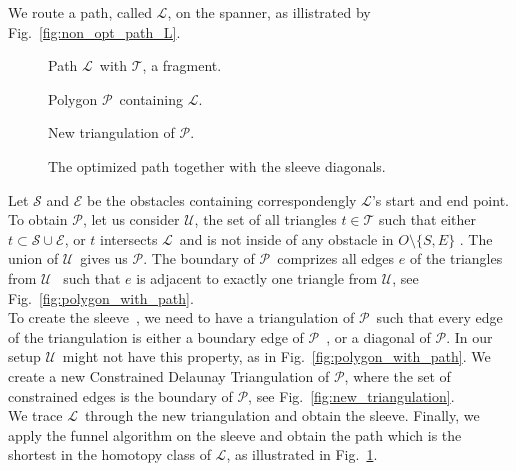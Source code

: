 \documentclass{gd-llncs}
\newcommand{\cdt}{$\mathcal{T}$}
\newcommand{\unpath}{$\mathcal{L}$}
\newcommand{\triset}{$\mathcal{U}$}
\newcommand{\plg}{$\mathcal{P}$}
\begin{document}
{We route a path, called \unpath, on the spanner, as illistrated by Fig.~\ref{fig:non_opt_path_L}.
\begin{figure}[!tbp]
  \centering
  \begin{minipage}[b]{0.45\textwidth}
    
    \caption{Path \unpath~with \cdt, a fragment.}
    \label{fig:non_opt_path_L}
  \end{minipage}
  \hfill
  \begin{minipage}[b]{0.45\textwidth}
    
    \caption{Polygon \plg~containing \unpath.}
    \label{fig:polygon_with_path}
  \end{minipage}
  \vfill
  \begin{minipage}[b]{0.45\textwidth}
    
    \caption{New triangulation of \plg.}
    \label{fig:new_triangulation}
  \end{minipage}
  \hfill
  \begin{minipage}[b]{0.45\textwidth}
    
    \caption{The optimized path together with the sleeve diagonals.}
    \label{fig:optimized_path}
  \end{minipage}
\end{figure}
Let $\mathcal{S}$ and $\mathcal{E}$ be the obstacles containing correspondengly \unpath's start and end point.
To obtain \plg, let us consider \triset, the set of all triangles ${t} \in \mathcal{T}$ such that
either ${t} \subset \mathcal{S} \cup \mathcal{E}$, or $t$ intersects \unpath~and is not inside of any obstacle in $O \setminus \{S,E\}$  .
The union of \triset~gives us \plg. The boundary of \plg~comprizes all edges $e$ of the triangles from \triset~ such that $e$ is adjacent to exactly one triangle from \triset, see Fig.~\ref{fig:polygon_with_path}. \\
To create the sleeve~\cite{chazelle1982theorem,hershberger1994computing}, we need to have a triangulation of \plg~such that every edge of the triangulation is either a boundary edge of \plg~, or a diagonal of \plg. In our setup \triset~might not have this property, as in Fig.~\ref{fig:polygon_with_path}. We create a new Constrained Delaunay Triangulation of \plg, where the set of constrained edges is the boundary of \plg, see Fig.~\ref{fig:new_triangulation}.\\
We trace \unpath~through the new triangulation and obtain the sleeve. Finally, we apply the funnel algorithm on the sleeve and obtain the path which is the shortest in the homotopy class of \unpath, as illustrated in Fig.~\ref{fig:optimized_path}.\\
}
\end{document}

